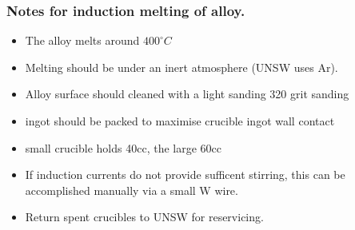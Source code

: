 \subsubsection{Notes for induction melting of \MgZnCa alloy.}
\begin{itemize}
\item The \MgZnCa alloy melts around $400^{\circ}C$
\item Melting should be under an inert atmosphere (UNSW uses Ar).
\item Alloy surface should cleaned with a light sanding 320 grit sanding
\item ingot should be packed to maximise crucible ingot wall contact
\item small crucible holds 40cc, the large 60cc
\item If induction currents do not provide sufficent stirring, this can be accomplished manually via a small W wire. 
\item Return spent crucibles to UNSW for reservicing. 
\end{itemize}